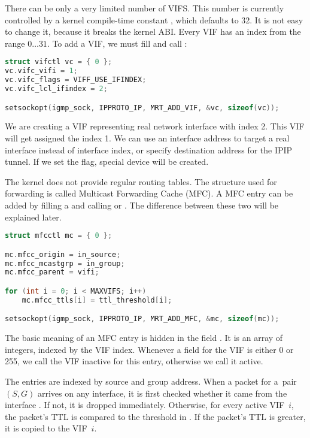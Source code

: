 There can be only a very limited number of VIFS. This number is currently
controlled by a kernel compile-time constant , which defaults to 32. It is not easy
to change it, because it breaks the kernel ABI. Every VIF has an index from the
range $0\dots31$. To add a VIF, we must fill  and call
:

\begin{lstlisting}[language=c]
struct vifctl vc = { 0 };
vc.vifc_vifi = 1;
vc.vifc_flags = VIFF_USE_IFINDEX;
vc.vifc_lcl_ifindex = 2;

setsockopt(igmp_sock, IPPROTO_IP, MRT_ADD_VIF, &vc, sizeof(vc));
\end{lstlisting}

\noindent We are creating a VIF representing real network interface with index 2. This VIF will
get assigned the index 1. We can use an interface address to target a real
interface instead of interface index, or specify destination address for the
IPIP tunnel. If we set the  flag, special device will be created.

The kernel does not provide regular routing tables. The structure used for
forwarding is called Multicast Forwarding Cache (MFC). A MFC entry can be added
by filling a  and calling  or
. The difference between these two will be
explained later.

\begin{lstlisting}[language=c]
struct mfcctl mc = { 0 };

mc.mfcc_origin = in_source;
mc.mfcc_mcastgrp = in_group;
mc.mfcc_parent = vifi;

for (int i = 0; i < MAXVIFS; i++)
    mc.mfcc_ttls[i] = ttl_threshold[i];

setsockopt(igmp_sock, IPPROTO_IP, MRT_ADD_MFC, &mc, sizeof(mc));
\end{lstlisting}

\noindent The basic meaning of an MFC entry is hidden in the field . It is
an array of  integers, indexed by the VIF index. Whenever a field for the VIF is
either 0 or 255, we call the VIF inactive for this entry, otherwise we call it
active.

\newdimen\charwidth
{} %

The entries are indexed by source and group address. When a packet for a~pair $(S,G)$
arrives on any interface, it is first checked whether it came from the
interface . If not, it is dropped immediately. Otherwise,
for every active VIF~$i$, the packet's TTL is compared to the threshold in
. If the packet's TTL is greater, it is copied to the
VIF~$i$.

